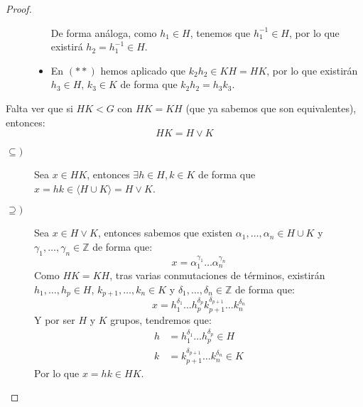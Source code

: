 \begin{prop}
\begin{proof}
\begin{description}
\begin{itemize}
                        De forma análoga, como $h_1\in H$, tenemos que $h_1^{-1}\in H$, por lo que existirá $h_2 = h_1^{-1}\in H$.
                    \item En $(\ast\ast)$ hemos aplicado que $k_2h_2 \in KH = HK$, por lo que existirán $h_3 \in H$, $k_3 \in K$ de forma que $k_2h_2 = h_3k_3$.
                \end{itemize}
        \end{description}
        Falta ver que si $HK < G$ con $HK = KH$ (que ya sabemos que son equivalentes), entonces:
        \begin{equation*}
            HK = H\lor K
        \end{equation*}
        \begin{description}
            \item [$\subseteq)$] Sea $x\in HK$, entonces $\exists h\in H, k\in K$ de forma que $x = hk\in \langle H\cup K \rangle = H\lor K$. 
            \item [$\supseteq)$] Sea $x\in H\lor K$, entonces sabemos que existen $\alpha_1,\ldots,\alpha_n \in H\cup K$ y $\gamma_1,\ldots,\gamma_n\in \mathbb{Z}$ de forma que:
                \begin{equation*}
                    x = \alpha_1^{\gamma_1}\ldots\alpha_n^{\gamma_n}
                \end{equation*}
                Como $HK = KH$, tras varias conmutaciones de términos, existirán ${h_1,\ldots,h_p \in H}$, $k_{p+1},\ldots,k_n\in K$ y $\delta_1,\ldots,\delta_n\in \mathbb{Z}$ de forma que:
                \begin{equation*}
                    x = h_1^{\delta_1}\ldots h_p^{\delta_p}k_{p+1}^{\delta_{p+1}}\ldots k_n^{\delta_n}
                \end{equation*}
                Y por ser $H$ y $K$ grupos, tendremos que:
                \begin{align*}
                    h &= h_1^{\delta_1}\ldots h_p^{\delta_p} \in H \\
                    k &= k_{p+1}^{\delta_{p+1}}\ldots k_n^{\delta_n} \in K
                \end{align*}
                Por lo que $x=hk \in HK$. \qedhere
        \end{description}
    \end{proof}
\end{prop}

